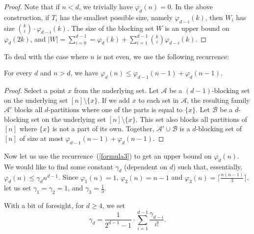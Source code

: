 \documentclass[11pt,a4paper]{article}
\begin{document}
\begin{proof}
    Note that if $n<d$, we trivially have $\varphi_d(n)=0$. In the above construction, if $T_i$ has the smallest possible size, namely $\varphi_{d-i}(k)$, then $W_i$ has size $\binom{k}{i} \cdot \varphi_{d-i}(k)$. The size of the blocking set $W$ is an upper bound on $\varphi_d(2k)$, and $|W|=\sum_{i=0}^{d-1}=\varphi_d(k) + \sum_{i=1}^{d-1}\binom{k}{i}\varphi_{d-i}(k).$
\end{proof}


To deal with the case where $n$ is not even, we use the following recurrence:

\begin{lemma}
\label{recurrence1}
    For every $d$ and $n> d$, we have $\varphi_d(n)\leq \varphi_{d-1}(n-1) + \varphi_d(n-1)$.
\end{lemma}


\begin{proof}
    Select a point $x$ from the underlying set. Let $\mathcal{A}$ be a $(d-1)$-blocking set on the underlying set $[n]\setminus \{x\}$. If we add $x$ to each set in $\mathcal{A}$, the resulting family $\mathcal{A}'$ blocks all $d$-partitions where one of the parts is equal to $\{x\}$. Let $\mathcal{B}$ be a $d$-blocking set on the underlying set $[n]\setminus \{x\}$. This set also blocks all partitions of $[n]$ where $\{x\}$ is not a part of its own. Together, $\mathcal{A}'\cup \mathcal{B}$ is a $d$-blocking set of $[n]$ of size at most $\varphi_{d-1}(n-1) + \varphi_d(n-1)$.
\end{proof}


Now let us use the recurrence~(\ref{formula3}) to get an upper bound on $\varphi_d(n)$. We would like to find some constant $\gamma_d$ (dependent on $d$) such that, essentially, $\varphi_d(n)\leq \gamma_d n^{d-1}$. Since $\varphi_1(n)=1$, $\varphi_2(n)=n-1$ and $\varphi_3(n)=\lceil \frac{n(n-1)}{3}\rceil$, let us set $\gamma_1=\gamma_2=1$, and $\gamma_3=\frac{1}{3}$.

With a bit of foresight, for $d\geq 4$, we set
\[
 \gamma_d= \frac{1}{2^{d-1} -1} \cdot \sum_{i=1}^{d-1} \frac{\gamma_{d-i}}{i!}.
\]

\end{document}
